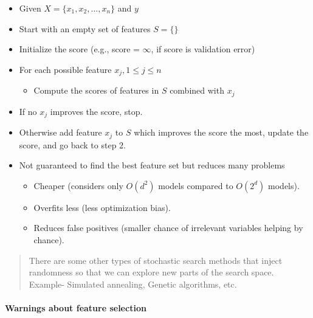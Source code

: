 \documentclass[]{article}
\providecommand{\tightlist}{%
  \setlength{\itemsep}{0pt}\setlength{\parskip}{0pt}}
\let\oldparagraph\paragraph
\renewcommand{\paragraph}[1]{\oldparagraph{#1}\mbox{}}
\begin{document}
\begin{itemize}
\tightlist
\item
  Given \(X = \{x_1, x_2, \dots, x_n\}\) and \(y\)\\
\item
  Start with an empty set of features \(S = \{\}\)\\
\item
  Initialize the score (e.g., score = \(\infty\), if score is validation
  error)\\
\item
  For each possible feature \(x_j, 1\leq j \leq n\)

  \begin{itemize}
  \tightlist
  \item
    Compute the scores of features in \(S\) combined with \(x_j\)\\
  \end{itemize}
\item
  If no \(x_j\) improves the score, stop.\\
\item
  Otherwise add feature \(x_j\) to \(S\) which improves the score the
  most, update the score, and go back to step 2.\\
\item
  Not guaranteed to find the best feature set but reduces many problems

  \begin{itemize}
  \tightlist
  \item
    Cheaper (considers only \(O(d^2)\) models compared to \(O(2^d)\)
    models).\\
  \item
    Overfits less (less optimization bias).\\
  \item
    Reduces false positives (smaller chance of irrelevant variables
    helping by chance).
  \end{itemize}
\end{itemize}

\begin{quote}
There are some other types of stochastic search methods that inject
randomness so that we can explore new parts of the search space.
Example- Simulated annealing, Genetic algorithms, etc.
\end{quote}

\hypertarget{warnings-about-feature-selection}{%
\paragraph{Warnings about feature
selection}\label{warnings-about-feature-selection}}
\end{document}
